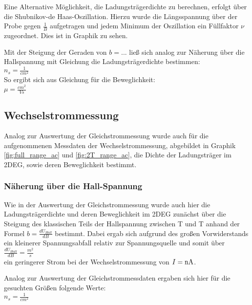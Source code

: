 Eine Alternative Möglichkeit, die Ladungsträgerdichte zu berechnen, erfolgt über die Shubnikov-de Haas-Oszillation. Hierzu wurde die Längsspannung über der Probe 
 gegen $\frac{1}{B}$ aufgetragen und jedem Minimum der Oszillation ein Füllfaktor $\nu$ zugeordnet. Dies ist in Graphik %
zu sehen. 

Mit der Steigung der Geraden von $b=...$  %
ließ sich analog zur Näherung über die Hallspannung mit Gleichung %
die Ladungsträgerdichte bestimmen:
\\
$n_s= \frac{1}{cm^2}$  %
\\
So ergibt sich aus Gleichung %
für die Beweglichkeit:
\\
$\mu= \frac{cm^2}{Vs}$  %


\subsection{Wechselstrommessung}
\label{Auswertung_Wechselstrom}

Analog zur Auswertung der Gleichstrommessung wurde auch für die aufgenommenen Messdaten der Wechselstrommessung, abgebildet in Graphik \ref{fig:full_range_ac} und \ref{fig:2T_range_ac}, die Dichte der Ladungsträger im 2DEG, sowie deren Beweglichkeit bestimmt.

\subsubsection{Näherung über die Hall-Spannung}
\label{über Hall-Spannung}

Wie in der Auswertung der Gleichstrommessung wurde auch hier die Ladungsträgerdichte und deren Beweglichkeit im 2DEG zunächst über die Steigung des klassischen Teils der Hallspannung zwischen \unit[-2]{T} und \unit[2]{T} anhand der Formel $b=\frac{dU_{Hall}}{dB}$  
bestimmt. Dabei ergab sich aufgrund des großen Vorwiderstands ein kleinerer Spannungsabfall relativ zur Spannungsquelle und somit über 
\\
$\frac{dU_{Hall}}{dB}=  \frac{m^2}{s}$  %
\\
ein geringerer Strom bei der Wechselstrommessung von $I=\unit[]{nA}$. %

Analog zur Auswertung der Gleichstrommessdaten ergaben sich hier für die gesuchten Größen folgende Werte: \\

$n_s= \frac{1}{cm^2}$  %


